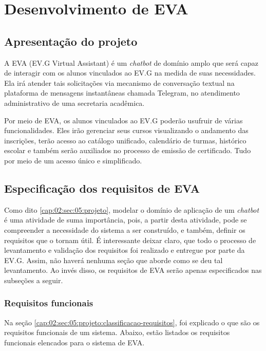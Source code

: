 \chapter{Desenvolvimento de EVA}

\section{Apresentação do projeto}


A EVA (EV.G Virtual Assistant) é um \textit{chatbot} de domínio amplo que será capaz de interagir com os alunos vinculados ao EV.G na medida de suas necessidades.
Ela irá atender tais solicitações via mecanismo de conversação textual na plataforma de mensagens instantâneas chamada Telegram, no atendimento administrativo de uma secretaria acadêmica.

Por meio de EVA, os alunos vinculados ao EV.G poderão usufruir de várias funcionalidades.
Eles irão gerenciar seus cursos visualizando o andamento das inscrições, terão acesso ao catálogo unificado, calendário de turmas, histórico escolar e também serão auxiliados no processo de emissão de certificado. Tudo por meio de um acesso único e simplificado.

\section{Especificação dos requisitos de EVA}

Como dito \ref{cap:02:sec:05:projeto}, modelar o domínio de aplicação de um \textit{chatbot} é uma atividade de suma importância, pois, a partir desta atividade, pode se compreender a necessidade do sistema a ser construído, e também, definir os requisitos que o tornam útil.
É interessante deixar claro, que todo o processo de levantamento e validação dos requisitos foi realizado e entregue por parte da EV.G. Assim, não haverá nenhuma seção que aborde como se deu tal levantamento. Ao invés disso, os requisitos de EVA serão apenas especificados nas subseções a seguir.

\subsection{Requisitos funcionais}

Na seção \ref{cap:02:sec:05:projeto:classificacao-requisitos}, foi explicado o que são os requisitos funcionais de um sistema. Abaixo, estão listados os requisitos funcionais elencados para o sistema de EVA.

